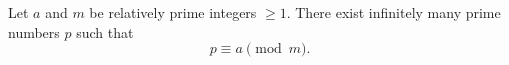 Let $a$ and $m$ be relatively prime integers $\geq 1$. There exist infinitely many prime numbers $p$ such that
$$p \equiv a \pmod{m}.$$
